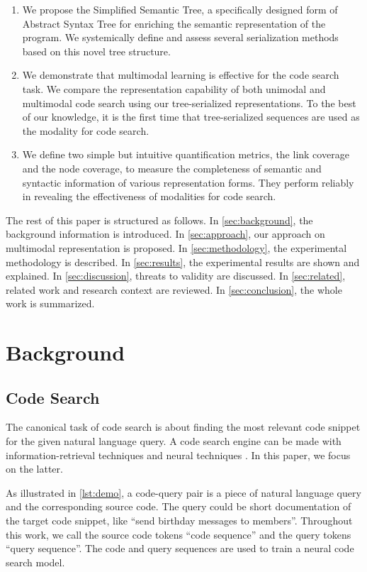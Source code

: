 \documentclass[conference]{IEEEtran}
\begin{document}
\begin{enumerate}
  \item We propose the Simplified Semantic Tree, a specifically designed form of Abstract Syntax Tree for enriching the semantic representation of the program. We systemically define and assess several serialization methods based on this novel tree structure.
  
  \item We demonstrate that multimodal learning is effective for the code search task. We compare the representation capability of both unimodal and multimodal code search using our tree-serialized representations. To the best of our knowledge, it is the first time that tree-serialized sequences are used as the modality for code search.

  \item We define two simple but intuitive quantification metrics, the link coverage and the node coverage, to measure the completeness of semantic and syntactic information of various representation forms. They perform reliably in revealing the effectiveness of modalities for code search.
\end{enumerate}

The rest of this paper is structured as follows. In \autoref{sec:background}, the background information is introduced. In \autoref{sec:approach}, our approach on multimodal representation is proposed. In \autoref{sec:methodology}, the experimental methodology is described. In \autoref{sec:results}, the experimental results are shown and explained. In \autoref{sec:discussion}, threats to validity are discussed. In \autoref{sec:related}, related work and research context are reviewed. In \autoref{sec:conclusion}, the whole work is summarized.
 \section{Background}
\label{sec:background}

\subsection{Code Search}

The canonical task of code search is about finding the most relevant code snippet for the given natural language query. A code search engine can be made with information-retrieval techniques and neural techniques \cite{Yan2020AreTC}. In this paper, we focus on the latter.

As illustrated in \autoref{lst:demo}, a code-query pair is a piece of natural language query and the corresponding source code. The query could be short documentation of the target code snippet, like ``send birthday messages to members''. Throughout this work, we call the source code tokens ``code sequence'' and the query tokens ``query sequence''. The code and query sequences are used to train a neural code search model.
\end{document}
